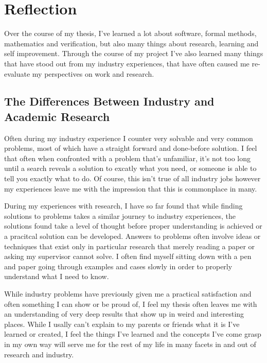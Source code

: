 \chapter{Reflection}\label{ch:reflection}

Over the course of my thesis, I've learned a lot about software, formal methods, mathematics and verification, but also
many things about research, learning and self improvement. Through the course of my project I've also learned many things
that have stood out from my industry experiences, that have often caused me re-evaluate my perspectives on work and research.

\section{The Differences Between Industry and Academic Research}

Often during my industry experience I counter very solvable and very common problems, most of which have a straight forward
and done-before solution. I feel that often when confronted with a problem that's unfamiliar, it's not too long until
a search reveals a solution to excatly what you need, or someone is able to tell you exactly what to do. Of course,
this isn't true of all industry jobs however my experiences leave me with the impression that this is commonplace in many.

During my experiences with research, I have so far found that while finding solutions to problems takes a similar journey
to industry experiences, the solutions found take a level of thought before proper understanding is achieved or a pracitcal
solution can be developed. Answers to problems often involve ideas or techniques that exist only in particular research
that merely reading a paper or asking my supervisor cannot solve. I often find myself sitting down with a pen and paper
going through examples and cases slowly in order to properly understand what I need to know.

While industry problems have previously given me a practical satisfaction and often something I can show or be proud of,
I feel my thesis often leaves me with an understanding of very deep results that show up in weird and interesting places.
While I usally can't explain to my parents or friends what it is I've learned or created, I feel the things I've learned and
the concepts I've come grasp in my own way will serve me for the rest of my life in many facets in and out of research and
industry.

